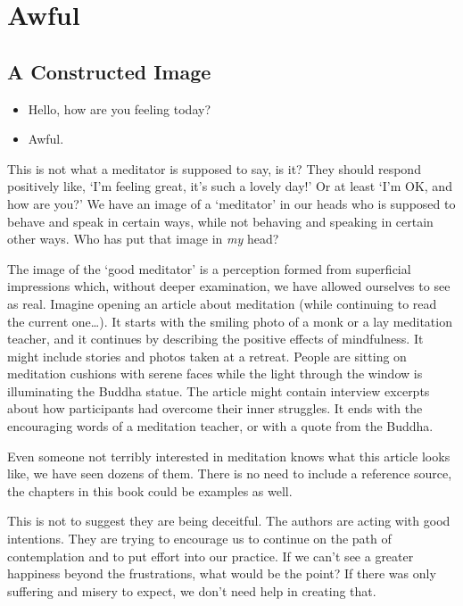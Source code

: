 \chapter{Awful}

\section{A Constructed Image}


\begin{itemize}
\tightlist
\item
  Hello, how are you feeling today?
\item
  Awful.
\end{itemize}

This is not what a meditator is supposed to say, is it? They should
respond positively like, `I'm feeling great, it's such a lovely day!' Or
at least `I'm OK, and how are you?' We have an image of a `meditator' in
our heads who is supposed to behave and speak in certain ways, while not
behaving and speaking in certain other ways. Who has put that image in
\emph{my} head?

The image of the `good meditator' is a perception formed from
superficial impressions which, without deeper examination, we have
allowed ourselves to see as real. Imagine opening an article about
meditation (while continuing to read the current one\ldots). It starts
with the smiling photo of a monk or a lay meditation teacher, and it
continues by describing the positive effects of mindfulness. It might
include stories and photos taken at a retreat. People are sitting on
meditation cushions with serene faces while the light through the window
is illuminating the Buddha statue. The article might contain interview
excerpts about how participants had overcome their inner struggles. It
ends with the encouraging words of a meditation teacher, or with a quote
from the Buddha.

Even someone not terribly interested in meditation knows what this
article looks like, we have seen dozens of them. There is no need to
include a reference source, the chapters in this book could be examples
as well.

This is not to suggest they are being deceitful. The authors are acting
with good intentions. They are trying to encourage us to continue on the
path of contemplation and to put effort into our practice. If we can't
see a greater happiness beyond the frustrations, what would be the
point? If there was only suffering and misery to expect, we don't need
help in creating that.

